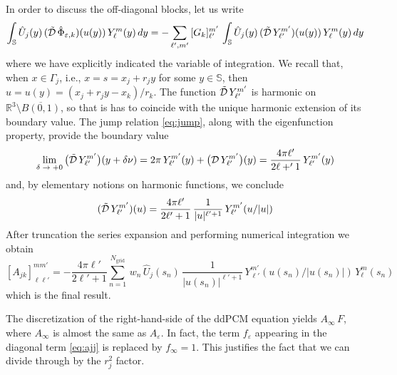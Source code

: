 In order to discuss the off-diagonal blocks, let us write
\[
 \int_{\mathbb{S}} \hat{U}_j(y) \, (\tilde{\mathcal{D}} \, \hat{\Phi}_{\varepsilon,k})(u(y)) \, Y_{\ell}^{m}(y) \, dy = - \sum_{\ell',m'} \, [G_k]_{\ell'}^{m'} \,  \int_{\mathbb{S}} \hat{U}_j(y) \, (\tilde{\mathcal{D}} \, Y_{\ell'}^{m'})(u(y)) \, Y_{\ell}^{m}(y) \, dy 
\]
where we have explicitly indicated the variable of integration. We recall that, when $x \in \Gamma_j$, i.e., $x = s = x_j + r_j y$ for some $y \in \mathbb{S}$, then $u = u(y) = (x_j + r_j y -x_k)/r_k$. The function $\tilde{\mathcal{D}} \, Y_{\ell'}^{m'}$ is harmonic on $\mathbb{R}^3 \setminus \overline{B(0,1)}$, so that is has to coincide with the unique harmonic extension of its boundary value. The jump relation \eqref{eq:jump}, along with the eigenfunction property, provide the boundary value
\[
\lim_{\delta \; \to \; + 0} \big(\tilde{\mathcal{D}} \, Y_{\ell'}^{m'}\big)(y + \delta \nu) =  2\pi \,Y_{\ell'}^{m'}(y)+ \big( \mathcal{D} \, Y_{\ell'}^{m'} \big)(y) = \frac{4 \pi \ell'}{2 \ell +' 1} \, Y_{\ell'}^{m'}(y)
\]
and, by elementary notions on harmonic functions, we conclude
\[
(\tilde{\mathcal{D}} \, Y_{\ell'}^{m'})(u) = \frac{4 \pi \ell'}{2 \ell' + 1} \, \frac{1}{|u|^{\ell' + 1}} \,  Y_{\ell'}^{m'}(u/|u|)
\]
After truncation the series expansion and performing numerical integration we obtain
\begin{equation}\label{eq:ajk}
[A_{jk}]_{\ell \ell'}^{m m'} =-  \frac{4 \pi \ell'}{2 \ell' + 1}  \sum_{n=1}^{N_\text{grid}} \, w_n  \,  \hat{U}_j(s_n) \, \frac{1}{|u(s_n)|^{\ell' + 1}} \, Y_{\ell'}^{m'}(u(s_n) / |u(s_n)|) \, Y_{\ell}^{m}(s_n)
\end{equation}
which is the final result.


The discretization of the right-hand-side of the ddPCM equation yields $A_\infty \, F$, where $A_\infty$ is almost the same as $A_\varepsilon$. In fact, the term $f_\varepsilon$ appearing in the diagonal term \eqref{eq:ajj} is replaced by $f_\infty = 1$. This justifies the fact that we can divide through by the $r_j^2$ factor.